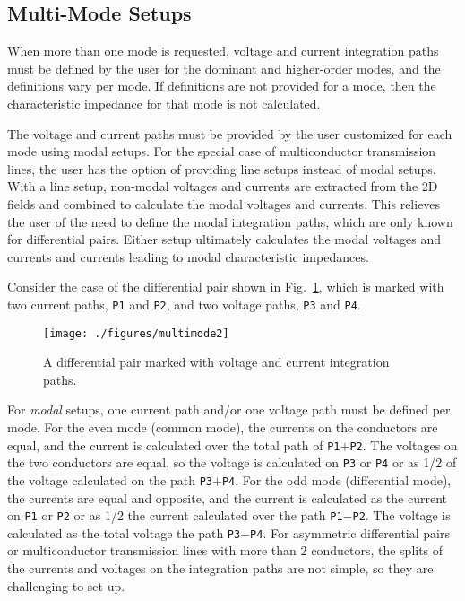 \documentclass[titlepage]{article}
\renewcommand\_{\textunderscore\linebreak[1]}
\begin{document}
\subsection{Multi-Mode Setups}

When more than one mode is requested, voltage and current integration paths must be defined by the user for the dominant and higher-order modes, and the definitions vary per mode.  If definitions are not provided for a mode, then the characteristic impedance for that mode is not calculated.

The voltage and current paths must be provided by the user customized for each mode using modal setups.  For the special case of multiconductor transmission lines, the user has the option of providing line setups instead of modal setups.  With a line setup, non-modal voltages and currents are extracted from the 2D fields and combined to calculate the modal voltages and currents.  This relieves the user of the need to define the modal integration paths, which are only known for differential pairs.  Either setup ultimately calculates the modal voltages and currents and currents leading to modal characteristic impedances.

Consider the case of the differential pair shown in Fig.~\ref{fig:multimode}, which is marked with two current paths, \texttt{\_P1} and \texttt{\_P2}, and two voltage paths, \texttt{\_P3} and \texttt{\_P4}.
\begin{figure}
  \centering
  \texttt{[image: ./figures/multimode2]}
  \caption{A differential pair marked with voltage and current integration paths.}
  \label{fig:multimode}
\end{figure}
For \textit{modal} setups, one current path and/or one voltage path must be defined per mode.  For the even mode (common mode), the currents on the conductors are equal, and the current is calculated over the total path of \texttt{\_P1$+$\_P2}.  The voltages on the two conductors are equal, so the voltage is calculated on \texttt{\_P3} or \texttt{\_P4} or as 1/2 of the voltage calculated on the path \texttt{\_P3$+$\_P4}.  For the odd mode (differential mode), the currents are equal and opposite, and the current is calculated as the current on \texttt{\_P1} or \texttt{\_P2} or as 1/2 the current calculated over the path \texttt{\_P1$-$\_P2}.  The voltage is calculated as the total voltage the path \texttt{\_P3$-$\_P4}.  For asymmetric differential pairs or multiconductor transmission lines with more than 2 conductors, the splits of the currents and voltages on the integration paths are not simple, so they are challenging to set up.
\end{document}
